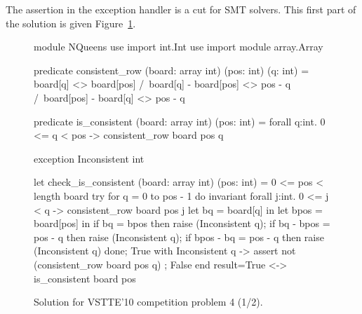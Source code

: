 The assertion in the exception handler is a cut for SMT solvers.
This first part of the solution is given Figure~\ref{fig:NQueens1}.
\begin{figure}
  \centering
\begin{whycode}
module NQueens
  use import int.Int
  use import module array.Array

  predicate consistent_row (board: array int) (pos: int) (q: int) =
    board[q] <> board[pos] /\
    board[q] - board[pos] <> pos - q /\
    board[pos] - board[q] <> pos - q

  predicate is_consistent (board: array int) (pos: int) =
    forall q:int. 0 <= q < pos -> consistent_row board pos q

  exception Inconsistent int

  let check_is_consistent (board: array int) (pos: int) =
    { 0 <= pos < length board }
    try
      for q = 0 to pos - 1 do
        invariant {
          forall j:int. 0 <= j < q -> consistent_row board pos j
        }
        let bq   = board[q]   in
        let bpos = board[pos] in
        if bq        = bpos    then raise (Inconsistent q);
        if bq - bpos = pos - q then raise (Inconsistent q);
        if bpos - bq = pos - q then raise (Inconsistent q)
      done;
      True
    with Inconsistent q ->
      assert { not (consistent_row board pos q) };
      False
    end
    { result=True <-> is_consistent board pos }
\end{whycode}
\vspace*{-2em}\hrulefill
  \caption{Solution for VSTTE'10 competition problem 4 (1/2).}
  \label{fig:NQueens1}
\end{figure}

